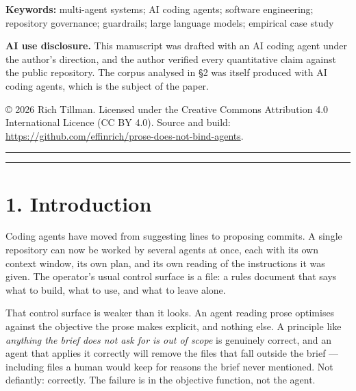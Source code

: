 \documentclass[11pt,a4paper]{article}
\begin{document}
\begin{abstract}
We then describe the mechanism that followed: moving constraints out of prose and into the build. Four rules --- hash-pinned protected files, mechanical invariants, required and forbidden gate targets, and separately bounded budgets --- all of which fail the build when violated. One episode is kept outside the findings, because no written rule answers it: the machine the agents ran on was compromised by a trojan (\S{}4.5). We argue that the design question for agent-assisted development is not how to write better instructions but what to make checkable, and that a repository governed by prose is governed by nothing.
\end{abstract}

\noindent\textbf{Keywords:} multi-agent systems; AI coding agents; software engineering;
repository governance; guardrails; large language models; empirical case study


\noindent\textbf{AI use disclosure.} This manuscript was drafted with an AI coding agent under the author's direction, and the author verified every quantitative claim against the public repository. The corpus analysed in \S{}2 was itself produced with AI coding agents, which is the subject of the paper.

© 2026 Rich Tillman. Licensed under the Creative Commons Attribution 4.0 International Licence (CC BY 4.0). Source and build: \url{https://github.com/effinrich/prose-does-not-bind-agents}.

\medskip\hrule\medskip

\medskip\hrule\medskip

\section*{1. Introduction}

Coding agents have moved from suggesting lines to proposing commits. A single repository can now be worked by several agents at once, each with its own context window, its own plan, and its own reading of the instructions it was given. The operator's usual control surface is a file: a rules document that says what to build, what to use, and what to leave alone.

That control surface is weaker than it looks. An agent reading prose optimises against the objective the prose makes explicit, and nothing else. A principle like \emph{anything the brief does not ask for is out of scope} is genuinely correct, and an agent that applies it correctly will remove the files that fall outside the brief --- including files a human would keep for reasons the brief never mentioned. Not defiantly: correctly. The failure is in the objective function, not the agent.
\end{document}
